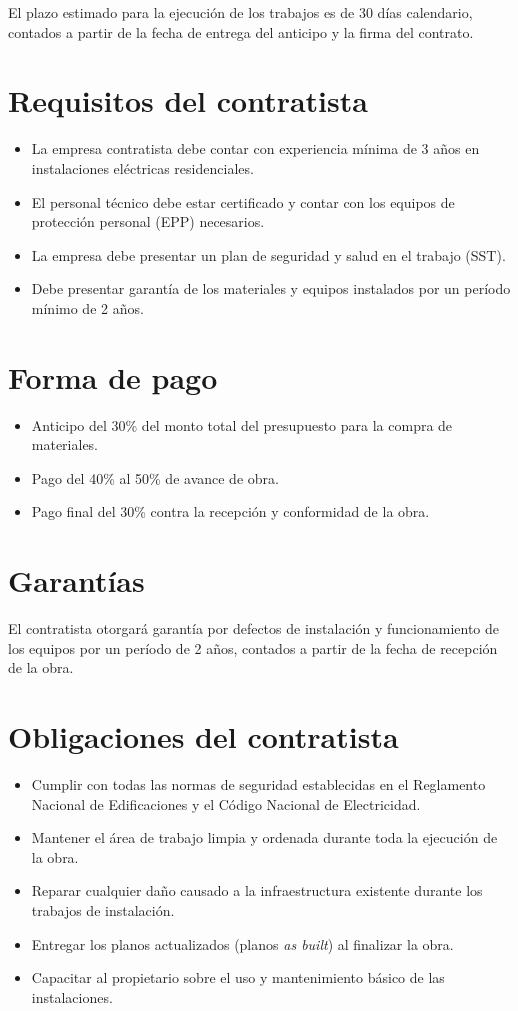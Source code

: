 El plazo estimado para la ejecución de los trabajos es de 30 días calendario, contados a partir de la fecha de entrega del anticipo y la firma del contrato.

\section{Requisitos del contratista}

\begin{itemize}
  \item La empresa contratista debe contar con experiencia mínima de 3 años en instalaciones eléctricas residenciales.
  \item El personal técnico debe estar certificado y contar con los equipos de protección personal (EPP) necesarios.
  \item La empresa debe presentar un plan de seguridad y salud en el trabajo (SST).
  \item Debe presentar garantía de los materiales y equipos instalados por un período mínimo de 2 años.
\end{itemize}

\section{Forma de pago}

\begin{itemize}
  \item Anticipo del 30\% del monto total del presupuesto para la compra de materiales.
  \item Pago del 40\% al 50\% de avance de obra.
  \item Pago final del 30\% contra la recepción y conformidad de la obra.
\end{itemize}

\section{Garantías}

El contratista otorgará garantía por defectos de instalación y funcionamiento de los equipos por un período de 2 años, contados a partir de la fecha de recepción de la obra.

\section{Obligaciones del contratista}

\begin{itemize}
  \item Cumplir con todas las normas de seguridad establecidas en el Reglamento Nacional de Edificaciones y el Código Nacional de Electricidad.
  \item Mantener el área de trabajo limpia y ordenada durante toda la ejecución de la obra.
  \item Reparar cualquier daño causado a la infraestructura existente durante los trabajos de instalación.
  \item Entregar los planos actualizados (planos \textit{as built}) al finalizar la obra.
  \item Capacitar al propietario sobre el uso y mantenimiento básico de las instalaciones.
\end{itemize}
